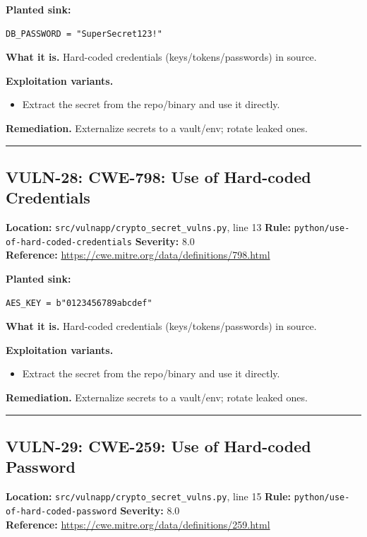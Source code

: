 \documentclass[11pt,a4paper]{article}
\begin{document}
\noindent\textbf{Planted sink:}
\begin{lstlisting}
DB_PASSWORD = "SuperSecret123!"
\end{lstlisting}
\noindent\textbf{What it is.} Hard-coded credentials (keys/tokens/passwords) in source.

\noindent\textbf{Exploitation variants.}
\begin{itemize}[leftmargin=1.4em,itemsep=1pt,topsep=2pt]
\item Extract the secret from the repo/binary and use it directly.
\end{itemize}
\noindent\textbf{Remediation.} Externalize secrets to a vault/env; rotate leaked ones.

\vspace{4pt}\hrule\vspace{6pt}
\subsection{VULN-28: CWE-798: Use of Hard-coded Credentials}
\noindent\textbf{Location:} \texttt{src/vulnapp/crypto\_secret\_vulns.py}, line 13 \quad \textbf{Rule:} \texttt{python/use-of-hard-coded-credentials} \quad \textbf{Severity:} 8.0
\\ \textbf{Reference:} \url{https://cwe.mitre.org/data/definitions/798.html}

\noindent\textbf{Planted sink:}
\begin{lstlisting}
AES_KEY = b"0123456789abcdef"
\end{lstlisting}
\noindent\textbf{What it is.} Hard-coded credentials (keys/tokens/passwords) in source.

\noindent\textbf{Exploitation variants.}
\begin{itemize}[leftmargin=1.4em,itemsep=1pt,topsep=2pt]
\item Extract the secret from the repo/binary and use it directly.
\end{itemize}
\noindent\textbf{Remediation.} Externalize secrets to a vault/env; rotate leaked ones.

\vspace{4pt}\hrule\vspace{6pt}
\subsection{VULN-29: CWE-259: Use of Hard-coded Password}
\noindent\textbf{Location:} \texttt{src/vulnapp/crypto\_secret\_vulns.py}, line 15 \quad \textbf{Rule:} \texttt{python/use-of-hard-coded-password} \quad \textbf{Severity:} 8.0
\\ \textbf{Reference:} \url{https://cwe.mitre.org/data/definitions/259.html}
\end{document}
